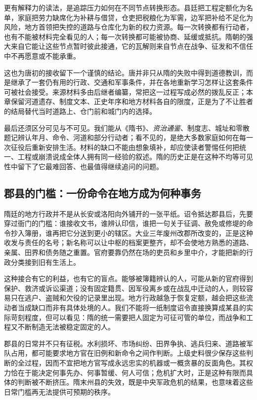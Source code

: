 更有解释力的读法，是追踪压力如何在不同节点转换形态。县廷把工程定额化为名单，家庭把劳力缺席化为补耕与借贷，仓吏把税粮化为军需，边军把补给不足化为风险，地方首领把失控的道路与仓库化为新的权力资源。每一次转换都有行动者，也有不能被材料完全看见的人；每一次转换都可能被协商、延缓或抵抗。隋朝的强大来自它能让这些节点暂时彼此接通，它的瓦解则来自节点在战争、征发和不信任中不再愿意或不能承重。

这也为唐初的接收留下一个谨慎的结论。唐并非只从隋的失败中得到道德教训，而是继承了一套仍有用的行政、交通和军事条件，并在各地重新学习怎样让这套条件可被社会接受。来源材料多由后继者编纂，常把这一过程写成必然的拨乱反正；本章保留河道遗存、制度文本、正史年序和地方材料各自的限度，正是为了不让胜者的结局替代当时道路上、仓门前和城门内的选择。

最后还须区分可见与不可见。我们能从《隋书》、\textit{资治通鉴}、制度志、城址和零散题记辨认年月、命令、河道和部分行动者；看不见的，是绝大多数家庭如何在每一次征役后重新安排生活。材料的缺口不能由想象填补，却应使读者警惕任何把统一、工程或崩溃说成全体人拥有同一经验的叙述。隋的历史正是在这种不均等可见性中留下了它最难回答、也最值得继续追问的问题。


\subsection{郡县的门槛：一份命令在地方成为何种事务}
隋廷的地方行政并不是从长安或洛阳向外铺开的一张平纸。诏令抵达郡县后，先要穿过衙门的门槛：谁接收文书，谁辨认印信，谁把一句关于征调、赦免或修堤的命令抄入簿册，谁再把它分送到更小的辖区。大业三年废州改郡所改变的，正是这种收发与责任的名号；新名称可以让中枢的档案更整齐，却不会使地方熟悉的道路、亲属、田界和债务随之重置。官府要靠仍然在场的吏员和乡里中介，才能把新的行政分类接到旧有生活上。

这种接合有它的利益，也有它的盲点。能够被簿籍辨认的人，可能从新的官府得到保护、救济或诉讼渠道；没有固定籍贯、因军役离乡或在战乱中迁动的人，则较容易只在逃户、盗贼和欠役的记录里出现。地方行政越急于恢复定额，越会把这些流动者当成缺口而非有具体处境的人。我们不能将一纸制度诏令直接换算成某县的实际苛刻程度，但可以看见：隋的统一需要把人固定为可征可管的单位，而战争和工程又不断制造无法被稳定固定的人。

郡县的日常并不只有征税。水利损坏、市场纠纷、田界争执、逃兵归来、道路被军队占用，都可能要求地方官在旧例和新命令之间作判断。上级史料很少保存这些判断的全过程，因而不宜把地方官写成永远忠实的机器或一概贪暴的反面角色。其权力恰在于能决定何事先办、何事暂缓、何人可信；危机扩大时，正是这种有限而具体的判断被不断挤压。隋末州县的失效，既是中央军政危机的结果，也意味着这些日常门槛再无法提供可预期的秩序。

